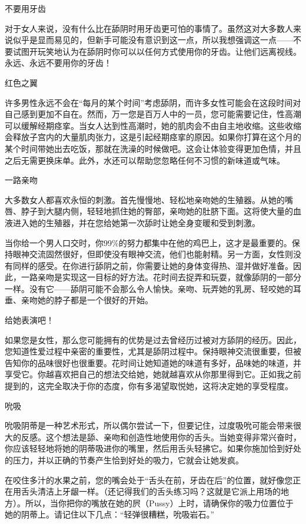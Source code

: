 \documentclass[12pt,UTF8]{ctexbook}
\begin{document}
不要用牙齿

对于女人来说，没有什么比在舔阴时用牙齿更可怕的事情了。虽然这对大多数人来说似乎是显而易见的，但新手可能没有意识到这一点，所以我想强调这一点——不要试图开玩笑地认为在舔阴时你可以以任何方式使用你的牙齿。让他们远离视线。永远、永远不要用你的牙齿！

红色之翼

许多男性永远不会在“每月的某个时间”考虑舔阴，而许多女性可能会在这段时间对自己感到更加不自在。然而，万一您是百万人中的一员，您可能需要记住，性高潮可以缓解经期痉挛。当女人达到性高潮时，她的肌肉会不由自主地收缩。这些收缩会释放子宫内的大量肌肉张力，这是引起经期痉挛的原因。如果你打算在这个月的某个时间带她出去吃饭，那就在洗澡的时候做吧。这会让体验变得更加色情，并且之后无需更换床单。此外，水还可以帮助您忽略任何不习惯的新味道或气味。

一路亲吻

大多数女人都喜欢永恒的刺激。首先慢慢地、轻松地亲吻她的生殖器。从她的嘴唇、脖子到大腿内侧，轻轻地抓住她的臀部，亲吻她的肚脐下面。这将使大量的血液进入她的生殖器，并在您给她第一次舔时让她全身变暖和受到刺激。

当你给一个男人口交时，你99\%的努力都集中在他的鸡巴上，这才是最重要的。保持眼神交流固然很好，但即使没有眼神交流，他们也能射精。另一方面，女性则没有同样的感受。在你进行舔阴之前，你需要让她的身体变得热、湿并做好准备。因此，一路亲吻是实现这一目标的好方法。花时间去捉弄和玩耍，就像舔阴的一部分一样。没有它——舔阴可能不会那么令人愉快。亲吻、玩弄她的乳房、轻咬她的耳垂、亲吻她的脖子都是一个很好的开始。

给她表演吧！

如果您是女性，那么您可能拥有的优势是过去曾经历过被对方舔阴的经历。因此，您知道性爱过程中亲密的重要性，尤其是舔阴过程中。保持眼神交流很重要，但被告知你的品味很好也很重要。花时间让她知道她的味道有多好，品味她的味道，并享受它。你越喜欢把自己的想法交给她，她就越喜欢从你那里得到它。正如我之前提到的，这完全取决于你的态度，你有多渴望取悦她，这将决定她的享受程度。

吮吸

吮吸阴蒂是一种艺术形式，所以偶尔尝试一下，但要记住，过度吸吮可能会带来很大的反感。这个想法是舔、亲吻和创造性地使用你的舌头。当她变得非常兴奋时，你应该轻轻地将她的阴蒂吸进你的嘴里，然后用舌头轻拂它。如果你施加恰到好处的压力，并以正确的节奏产生恰到好处的吸力，它就会让她发疯。

在咬住多汁的水果之前，您的嘴会处于“舌头在前，牙齿在后”的位置，就好像您正在用舌头清洁上牙龈一样。（还记得我们的舌头练习吗？这就是它派上用场的地方）。所以，当你把你的嘴放在她的屄（Pussy）上时，请确保你的吸力位置位于她的阴蒂上。请记住以下几点：“轻弹很糟糕，吮吸岩石。”
\end{document}
